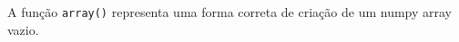 \documentclass[12pt,varwidth=16cm,border=1pt]{standalone}
\begin{document}
A função \verb+array()+ representa uma forma correta de criação de um numpy array vazio.

\questiomfalse
\end{document}
